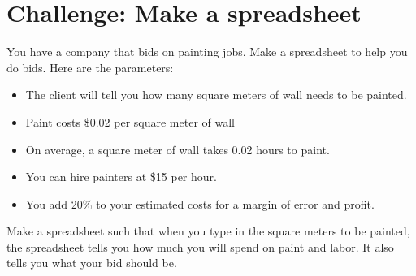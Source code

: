 \section{Challenge: Make a spreadsheet}

You have a company that bids on painting jobs. Make a
spreadsheet to help you do bids. Here are the parameters:
\begin{itemize}
\item The client will tell you how many square meters of wall needs to be painted.
\item Paint costs \$0.02 per square meter of wall
\item On average, a square meter of wall takes 0.02 hours to paint.
\item You can hire painters at \$15 per hour.
\item You add 20\% to your estimated costs for a margin of error and profit.
\end{itemize}

Make a spreadsheet such that when you type in the square meters to be
painted, the spreadsheet tells you how much you will spend on paint
and labor.  It also tells you what your bid should be.
